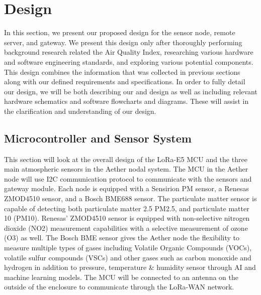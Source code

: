 \section{Design}
In this section, we present our proposed design for the sensor node, remote server, and gateway. We present this design only after thoroughly performing background research related the Air Quality Index, researching various hardware and software engineering standards, and exploring various potential components. This design combines the information that was collected in previous sections along with our defined requirements and specifications. In order to fully detail our design, we will be both describing our and design as well as including relevant hardware schematics and software flowcharts and diagrams. These will assist in the clarification and understanding of our design.


\subsection{Microcontroller and Sensor System}
This section will look at the overall design of the LoRa-E5 MCU and the three main atmospheric sensors in the Aether nodal system. The MCU in the Aether node will use I2C communication protocol to communicate with the sensors and gateway module. Each node is equipped with a Sensirion PM sensor, a Renesas ZMOD4510 sensor, and a Bosch BME688 sensor. The particulate matter sensor is capable of detecting both particulate matter 2.5 PM2.5, and particulate matter 10 (PM10). Renesas' ZMOD4510 sensor is equipped with non-selective nitrogen dioxide (NO2) measurement capabilities with a selective measurement of ozone (O3) as well. The Bosch BME sensor gives the Aether node the flexibility to measure multiple types of gases including Volatile Organic Compounds (VOCs), volatile sulfur compounds (VSCs) and other gases such as carbon monoxide and hydrogen in addition to pressure, temperature & humidity sensor through AI and machine learning models. The MCU will be connected to an antenna on the outside of the enclosure to communicate through the LoRa-WAN network.

